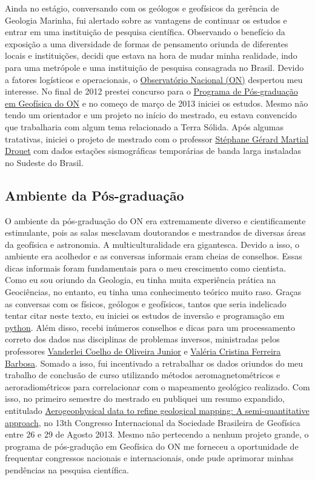 \documentclass[10pt,a4paper,oneside]{book}
\begin{document}
Ainda no estágio, conversando com os geólogos e geofísicos da gerência de Geologia Marinha, fui alertado sobre as vantagens de continuar os estudos e entrar em uma instituição de pesquisa científica. Observando o benefício da exposição a uma diversidade de formas de pensamento oriunda de diferentes locais e instituições, decidi que estava na hora de mudar minha realidade, indo para uma metrópole e uma instituição de pesquisa consagrada no Brasil. Devido a fatores logísticos e operacionais, o \href{https://www.gov.br/observatorio/pt-br}{Observatório Nacional (ON)} despertou meu interesse. No final de 2012 prestei concurso para o \href{https://www.gov.br/observatorio/pt-br/assuntos/programas-academicos/pos-graduacao-em-geofisica}{Programa de Pós-graduação em Geofísica do ON} e no começo de março de 2013 iniciei os estudos. Mesmo não tendo um orientador e um projeto no início do mestrado, eu estava convencido que trabalharia com algum tema relacionado a Terra Sólida. Após algumas tratativas, iniciei o projeto de mestrado com o professor \href{http://lattes.cnpq.br/0563544084744404}{Stéphane Gérard Martial Drouet} com dados estações sismográficas temporárias de banda larga instaladas no Sudeste do Brasil.

\subsection{Ambiente da Pós-graduação}
\label{sec_posgrad_on}

O ambiente da pós-graduação do ON era extremamente diverso e cientificamente estimulante, pois as salas mesclavam doutorandos e mestrandos de diversas áreas da geofísica e astronomia. A multiculturalidade era gigantesca. Devido a isso, o ambiente era acolhedor e as conversas informais eram cheias de conselhos. Essas dicas informais foram fundamentais para o meu crescimento como cientista. Como eu sou oriundo da Geologia, eu tinha muita experiência prática na Geociências, no entanto, eu tinha uma conhecimento teórico muito raso. Graças as conversas com os físicos, geólogos e geofísicos, tantos que seria indelicado tentar citar neste texto, eu iniciei os estudos de inversão e programação em \href{https://www.python.org/}{python}. Além disso, recebi inúmeros conselhos e dicas para um processamento correto dos dados nas disciplinas de problemas inversos, ministradas pelos professores \href{http://lattes.cnpq.br/4332841435949533}{Vanderlei Coelho de Oliveira Junior} e \href{http://lattes.cnpq.br/0391036221142471}{Valéria Cristina Ferreira Barbosa}. Somado a isso, fui incentivado a retrabalhar os dados oriundos do meu trabalho de conclusão de curso utilizando métodos aeromagnetométricos e aeroradiométricos para correlacionar com o mapeamento geológico realizado. Com isso, no primeiro semestre do mestrado eu publiquei um resumo expandido, entitulado \href{https://doi.org/10.1190/sbgf2013-129}{Aerogeophysical data to refine geological mapping: A semi-quantitative approach}, no 13th Congresso Internacional da Sociedade Brasileira de Geofísica entre 26 e 29 de Agosto 2013. Mesmo não pertecendo a nenhum projeto grande, o programa de pós-gradução em Geofísica do ON me forneceu a oportunidade de frequentar congressos nacionais e internacionais, onde pude aprimorar minhas pendências na pesquisa científica.
\end{document}
